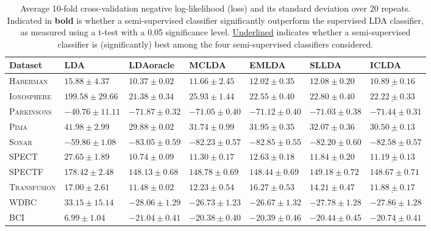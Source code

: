 \documentclass[twoside]{memoir}\usepackage[]{graphicx}\usepackage{xcolor}
\begin{document}
\begin{table}
\caption{Average 10-fold cross-validation negative log-likelihood (loss) and its standard deviation over 20 repeats. Indicated in \textbf{bold} is whether a semi-supervised classifier significantly outperform the supervised LDA classifier, as measured using a t-test with a 0.05 significance level. \underline{Underlined} indicates whether a semi-supervised classifier is (significantly) best among the four semi-supervised classifiers considered. } \label{table:cvresults-loss}
\centering
\tiny\begin{tabular}{lllllll}
\toprule
Dataset & LDA & LDAoracle & MCLDA & EMLDA & SLLDA & ICLDA \\ 
\midrule
\textsc{ Haberman }& $15.88 \pm 4.37$& $10.37 \pm 0.02$& $\mathbf{11.66 \pm 2.45} $& $\mathbf{12.02 \pm 0.35} $& $\mathbf{12.08 \pm 0.20} $& $\mathbf{\underline{10.89 \pm 0.16}} $\\ 
\textsc{ Ionosphere }& $199.58 \pm 29.66$& $21.38 \pm 0.34$& $\mathbf{25.93 \pm 1.44} $& $\mathbf{22.55 \pm 0.40} $& $\mathbf{22.80 \pm 0.40} $& $\mathbf{\underline{22.22 \pm 0.33}} $\\ 
\textsc{ Parkinsons }& $-40.76 \pm 11.11$& $-71.87 \pm 0.32$& $\mathbf{-71.05 \pm 0.40} $& $\mathbf{-71.12 \pm 0.40} $& $\mathbf{-71.03 \pm 0.38} $& $\mathbf{\underline{-71.44 \pm 0.31}} $\\ 
\textsc{ Pima }& $41.98 \pm 2.99$& $29.88 \pm 0.02$& $\mathbf{31.74 \pm 0.99} $& $\mathbf{31.95 \pm 0.35} $& $\mathbf{32.07 \pm 0.36} $& $\mathbf{\underline{30.50 \pm 0.13}} $\\ 
\textsc{ Sonar }& $-59.86 \pm 1.08$& $-83.05 \pm 0.59$& $\mathbf{-82.23 \pm 0.57} $& $\mathbf{-82.85 \pm 0.55} $& $\mathbf{-82.20 \pm 0.60} $& $\mathbf{-82.58 \pm 0.57} $\\ 
\textsc{ SPECT }& $27.65 \pm 1.89$& $10.74 \pm 0.09$& $\mathbf{11.30 \pm 0.17} $& $\mathbf{12.63 \pm 0.18} $& $\mathbf{11.84 \pm 0.20} $& $\mathbf{\underline{11.19 \pm 0.13}} $\\ 
\textsc{ SPECTF }& $178.42 \pm 2.48$& $148.13 \pm 0.68$& $\mathbf{148.78 \pm 0.69} $& $\mathbf{148.44 \pm 0.69} $& $\mathbf{149.18 \pm 0.72} $& $\mathbf{148.67 \pm 0.71} $\\ 
\textsc{ Transfusion }& $17.00 \pm 2.61$& $11.48 \pm 0.02$& $\mathbf{12.23 \pm 0.54} $& $16.27 \pm 0.53$& $\mathbf{14.21 \pm 0.47} $& $\mathbf{\underline{11.88 \pm 0.17}} $\\ 
\textsc{ WDBC }& $33.15 \pm 15.14$& $-28.06 \pm 1.29$& $\mathbf{-26.73 \pm 1.23} $& $\mathbf{-26.67 \pm 1.32} $& $\mathbf{-27.78 \pm 1.28} $& $\mathbf{\underline{-27.86 \pm 1.28}} $\\ 
\textsc{ BCI }& $6.99 \pm 1.04$& $-21.04 \pm 0.41$& $\mathbf{-20.38 \pm 0.40} $& $\mathbf{-20.39 \pm 0.46} $& $\mathbf{-20.44 \pm 0.45} $& $\mathbf{\underline{-20.74 \pm 0.41}} $\\ 
\bottomrule
\end{tabular}
\end{table}
\end{document}
